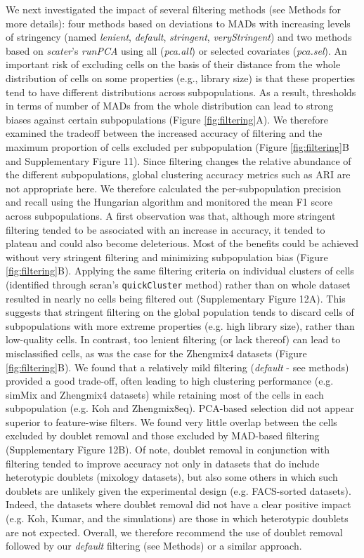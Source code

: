 \documentclass{bmcart}
\begin{document}
{\color{red}We next investigated the impact of several filtering methods (see Methods for more details): four methods based on deviations to MADs with increasing levels of stringency (named \textit{lenient}, \textit{default}, \textit{stringent}, \textit{veryStringent}) and two methods based on \textit{scater}'s \textit{runPCA} using all (\textit{pca.all}) or selected covariates (\textit{pca.sel})}. An important risk of excluding cells on the basis of their distance from the whole distribution of cells on some properties (e.g., library size) is that these properties tend to have different distributions across subpopulations. As a result, thresholds in terms of number of MADs from the whole distribution can lead to strong biases against certain subpopulations (Figure \ref{fig:filtering}A). We therefore examined the tradeoff between the increased accuracy of filtering and the maximum proportion of cells excluded per subpopulation (Figure \ref{fig:filtering}B and Supplementary Figure 11). Since filtering changes the relative abundance of the different subpopulations, global clustering accuracy metrics such as ARI are not appropriate here. We therefore calculated the per-subpopulation precision and recall using the Hungarian algorithm \cite{kuhnHungarianMethod1955} and monitored the mean F1 score {\color{red}across subpopulations. A first observation was that, although more stringent filtering tended to be associated with an increase in accuracy, it tended to plateau and could also become deleterious. Most of the benefits could be achieved without very stringent filtering and minimizing subpopulation bias (Figure \ref{fig:filtering}B). Applying the same filtering criteria on individual clusters of cells (identified through scran's \texttt{quickCluster} method) rather than on whole dataset resulted in nearly no cells being filtered out (Supplementary Figure 12A). This suggests that stringent filtering on the global population tends to discard cells of subpopulations with more extreme properties (e.g. high library size), rather than low-quality cells. In contrast, too lenient filtering (or lack thereof) can lead to misclassified cells, as was the case for the Zhengmix4 datasets (Figure \ref{fig:filtering}B). We found that a relatively mild filtering (\textit{default} - see methods) provided a good trade-off, often leading to high clustering performance (e.g. simMix and Zhengmix4 datasets) while retaining most of the cells in each subpopulation (e.g. Koh and Zhengmix8eq). PCA-based selection did not appear superior to feature-wise filters. We found very little overlap between the cells excluded by doublet removal and those excluded by MAD-based filtering (Supplementary Figure 12B). Of note, doublet removal in conjunction with filtering tended to improve accuracy not only in datasets that do include heterotypic doublets (mixology datasets), but also some others in which such doublets are unlikely given the experimental design (e.g. FACS-sorted datasets). Indeed, the datasets where doublet removal did not have a clear positive impact (e.g. Koh, Kumar, and the simulations) are those in which heterotypic doublets are not expected. Overall, we therefore recommend the use of doublet removal followed by our \textit{default} filtering (see Methods) or a similar approach.}
\end{document}
